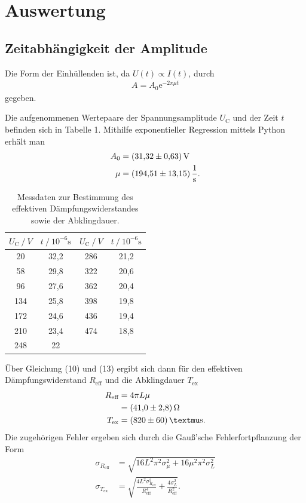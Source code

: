 \section{Auswertung}
\label{sec:Auswertung}

\subsection{Zeitabhängigkeit der Amplitude}

Die Form der Einhüllenden ist, da $\mathit{U(t) \propto I(t)}$, durch
\begin{align*}
A = A_\text{0} \mathrm{e}^{-2 \pi \mu t}
\end{align*}
gegeben.


Die aufgenommenen Wertepaare der Spannungsamplitude $U_\text{C}$ und der Zeit $t$
befinden sich in Tabelle 1. Mithilfe exponentieller Regression mittels Python erhält man
\begin{align*}
A_\text{0} &= (\num{31,32 +- 0,63})\,\mathrm{V} \\
\mu &= (\num{194.51 +- 13.15})\,\mathrm{\frac{1}{s}} .
\end{align*}

\begin{table}[H]
\centering
\caption{Messdaten zur Bestimmung des effektiven Dämpfungswiderstandes sowie der Abklingdauer.}
\label{tab:some_data}
\begin{tabular}{c c c c}
\toprule
$U_\text{C} \:/\: V$ & $t \:/\: 10^{-6}\si{\second}$ & $U_\text{C} \:/\: V$ & $t \:/\: 10^{-6}\si{\second}$\\
\midrule
20  & 32,2 & 286 & 21,2\\
58  & 29,8 & 322 & 20,6\\
96  & 27,6 & 362 & 20,4\\
134 & 25,8 & 398 & 19,8\\
172 & 24,6 & 436 & 19,4\\
210 & 23,4 & 474 & 18,8\\
248 & 22 \\
\bottomrule
\end{tabular}
\end{table}

Über Gleichung (10) und (13) ergibt sich dann für den effektiven Dämpfungswiderstand
$R_\text{eff}$ und die Abklingdauer $T_\text{ex}$ 
\begin{align*}
R_\text{eff} &= 4 \pi L \mu\\
       &= (\num{41.0 +- 2.8})\,\si{\ohm}\\
T_\text{ex} &= (\num{820 +- 60})\,\mathrm{µs}.
\end{align*}
Die zugehörigen Fehler ergeben sich durch die Gauß'sche Fehlerfortpflanzung der Form
\begin{align*}
\sigma_{R_\text{eff}} &= \sqrt{ 16 L^{2} \pi^{2} \sigma_{\mu}^{2} + 16 \mu^{2} \pi^{2} \sigma_{L}^{2}} \\
\sigma_{T_\text{ex}} &= \sqrt{\frac{4 L^{2} \sigma_{R_\text{eff}}^{2}}{R_\text{eff}^{4}} + \frac{4 \sigma_{L}^{2}}{R_\text{eff}^{2}}}.
\end{align*}

